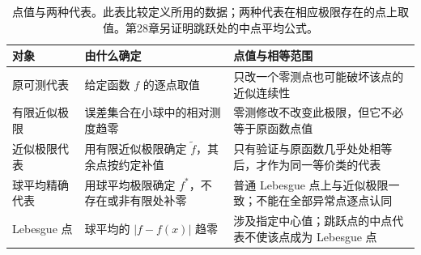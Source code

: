 \begin{table}[htbp]
\centering\small\renewcommand{\arraystretch}{1.18}\setlength{\tabcolsep}{4pt}
\caption[点值与两种代表]{点值与两种代表。此表比较定义所用的数据；两种代表在相应极限存在的点上取值。第28章另证明跳跃处的中点平均公式。}
\label{b1:tab:visual-t08}
\begin{tabularx}{\linewidth}{@{}>{\raggedright\arraybackslash}p{3.1cm}>{\raggedright\arraybackslash}p{4.7cm}>{\raggedright\arraybackslash}X@{}}
\toprule
对象 & 由什么确定 & 点值与相等范围 \\
\midrule
原可测代表 & 给定函数 \(f\) 的逐点取值 & 只改一个零测点也可能破坏该点的近似连续性 \\
有限近似极限 & 误差集合在小球中的相对测度趋零 & 零测修改不改变此极限，但它不必等于原函数点值 \\
近似极限代表 & 用有限近似极限确定 \(\widetilde f\)，其余点按约定补值 & 只有验证与原函数几乎处处相等后，才作为同一等价类的代表 \\
球平均精确代表 & 用球平均极限确定 \(f^*\)，不存在或非有限处补零 & 普通 Lebesgue 点上与近似极限一致；不能在全部异常点逐点认同 \\
Lebesgue 点 & 球平均的 \(|f-f(x)|\) 趋零 & 涉及指定中心值；跳跃点的中点代表不使该点成为 Lebesgue 点 \\
\bottomrule
\end{tabularx}
\end{table}
